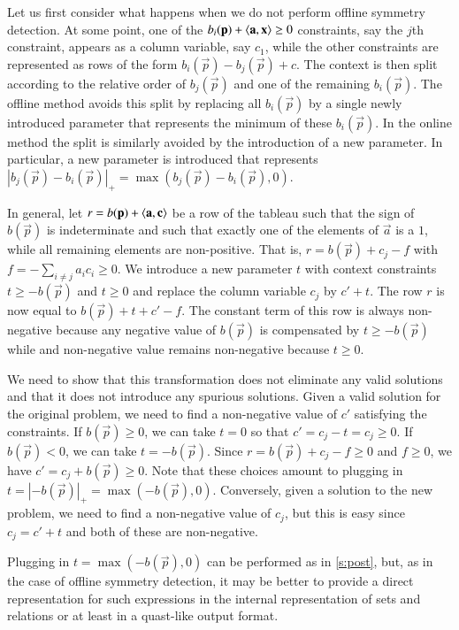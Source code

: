Let us first consider what happens when we do not perform offline
symmetry detection.  At some point, one of the
$b_i(\vec p) + \sp {\vec a} {\vec x} \ge 0$ constraints,
say the $j$th constraint, appears as a column
variable, say $c_1$, while the other constraints are represented
as rows of the form $b_i(\vec p) - b_j(\vec p) + c$.
The context is then split according to the relative order of
$b_j(\vec p)$ and one of the remaining $b_i(\vec p)$.
The offline method avoids this split by replacing all $b_i(\vec p)$
by a single newly introduced parameter that represents the minimum
of these $b_i(\vec p)$.
In the online method the split is similarly avoided by the introduction
of a new parameter.  In particular, a new parameter is introduced
that represents
$\left| b_j(\vec p) - b_i(\vec p) \right|_+ =
\max(b_j(\vec p) - b_i(\vec p), 0)$.

In general, let $r = b(\vec p) + \sp {\vec a} {\vec c}$ be a row
of the tableau such that the sign of $b(\vec p)$ is indeterminate
and such that exactly one of the elements of $\vec a$ is a $1$,
while all remaining elements are non-positive.
That is, $r = b(\vec p) + c_j - f$ with $f = -\sum_{i\ne j} a_i c_i \ge 0$.
We introduce a new parameter $t$ with
context constraints $t \ge -b(\vec p)$ and $t \ge 0$ and replace
the column variable $c_j$ by $c' + t$.  The row $r$ is now equal
to $b(\vec p) + t + c' - f$.  The constant term of this row is always
non-negative because any negative value of $b(\vec p)$ is compensated
by $t \ge -b(\vec p)$ while and non-negative value remains non-negative
because $t \ge 0$.

We need to show that this transformation does not eliminate any valid
solutions and that it does not introduce any spurious solutions.
Given a valid solution for the original problem, we need to find
a non-negative value of $c'$ satisfying the constraints.
If $b(\vec p) \ge 0$, we can take $t = 0$ so that
$c' = c_j - t = c_j \ge 0$.
If $b(\vec p) < 0$, we can take $t = -b(\vec p)$.
Since $r = b(\vec p) + c_j - f \ge 0$ and $f \ge 0$, we have 
$c' = c_j + b(\vec p) \ge 0$.
Note that these choices amount to plugging in
$t = \left|-b(\vec p)\right|_+ = \max(-b(\vec p), 0)$.
Conversely, given a solution to the new problem, we need to find
a non-negative value of $c_j$, but this is easy since $c_j = c' + t$
and both of these are non-negative.

Plugging in $t = \max(-b(\vec p), 0)$ can be performed as in
\autoref{s:post}, but, as in the case of offline symmetry detection,
it may be better to provide a direct representation for such
expressions in the internal representation of sets and relations
or at least in a quast-like output format.

